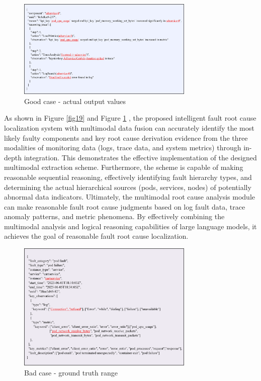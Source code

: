 \documentclass[10pt]{article}
\let\oldref\ref
\renewcommand{\ref}[1]{%
    \textcolor{blue}{\oldref{#1}}%
}
\begin{document}
\begin{figure}[!t]
    \centering
    \includegraphics[width=0.75\textwidth]{pics/fig20.png}
    \caption{Good case - actual output values}
    \label{fig20}
\end{figure}

As shown in Figure \ref{fig19} and Figure \ref{fig20}, the proposed intelligent fault root cause localization system with multimodal data fusion can accurately identify the most likely faulty components and key root cause derivation evidence from the three modalities of monitoring data (logs, trace data, and system metrics) through in-depth integration. This demonstrates the effective implementation of the designed multimodal extraction scheme. Furthermore, the scheme is capable of making reasonable sequential reasoning, effectively identifying fault hierarchy types, and determining the actual hierarchical sources (pods, services, nodes) of potentially abnormal data indicators. Ultimately, the multimodal root cause analysis module can make reasonable fault root cause judgments based on log fault data, trace anomaly patterns, and metric phenomena. By effectively combining the multimodal analysis and logical reasoning capabilities of large language models, it achieves the goal of reasonable fault root cause localization.

\begin{figure}[!t]
    \centering
    \includegraphics[width=0.75\textwidth]{pics/fig21.png}
    \caption{Bad case - ground truth range}
    \label{fig21}
\end{figure}
\end{document}
